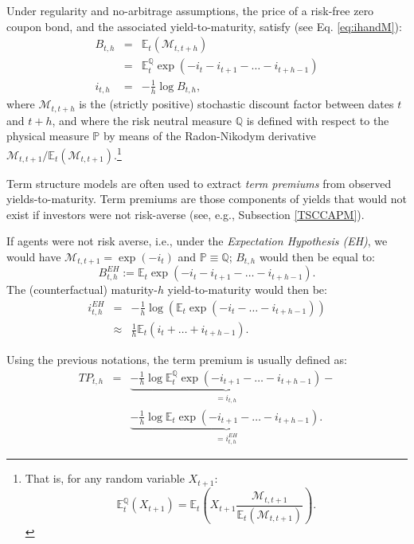 \documentclass[
  12pt,
]{book}
\theoremstyle{definition}
\theoremstyle{definition}
\theoremstyle{definition}
\theoremstyle{definition}
\theoremstyle{remark}
\begin{document}
Under regularity and no-arbitrage assumptions, the price of a risk-free zero coupon bond, and the associated yield-to-maturity, satisfy (see Eq. \eqref{eq:ihandM}):
\begin{eqnarray}
B_{t,h} &=& \mathbb{E}_t (\mathcal{M}_{t,t+h})\nonumber\\
&=& \mathbb{E}^{\mathbb{Q}}_t \exp(-i_t -i_{t+1}-\dots-i_{t+h-1})\nonumber\\
i_{t,h} &=& - \frac{1}{h} \log B_{t,h}, \label{eq:stdbondRFchapter}
\end{eqnarray}
where \(\mathcal{M}_{t,t+h}\) is the (strictly positive) stochastic discount factor between dates \(t\) and \(t+h\), and where the risk neutral measure \(\mathbb{Q}\) is defined with respect to the physical measure \(\mathbb{P}\) by means of the Radon-Nikodym derivative \(\mathcal{M}_{t,t+1}\big/\mathbb{E}_t(\mathcal{M}_{t,t+1})\).\footnote{That is, for any random variable \(X_{t+1}\):
  \[
  \mathbb{E}^{\mathbb{Q}}_t(X_{t+1})=\mathbb{E}_t\left(X_{t+1}\frac{\mathcal{M}_{t,t+1}}{\mathbb{E}_t(\mathcal{M}_{t,t+1})}\right).
  \]}

Term structure models are often used to extract \emph{term premiums} from observed yields-to-maturity. Term premiums are those components of yields that would not exist if investors were not risk-averse (see, e.g., Subsection \ref{TSCCAPM}).

If agents were not risk averse, i.e., under the \emph{Expectation Hypothesis (EH)}, we would have \(\mathcal{M}_{t,t+1} = \exp(- i_t)\) and \(\mathbb{P} \equiv \mathbb{Q}\); \(B_{t,h}\) would then be equal to:
\begin{equation}
B^{EH}_{t,h} := \mathbb{E}_t \exp(-i_{t}-i_{t+1}-\dots-i_{t+h-1}).\label{eq:stdbondRFchapterP}
\end{equation}
The (counterfactual) maturity-\(h\) yield-to-maturity would then be:
\begin{eqnarray}
i^{EH}_{t,h} &=& -\frac{1}{h}\log \left( \mathbb{E}_t \exp(-i_t-\dots-i_{t+h-1})\right)\nonumber\\
&\approx& \frac{1}{h}\mathbb{E}_t(i_t + \dots + i_{t+h-1}).\label{eq:REH}
\end{eqnarray}

Using the previous notations, the term premium is usually defined as:
\begin{eqnarray}
TP_{t,h} &=& \underbrace{- \frac{1}{h} \log  \mathbb{E}^{\mathbb{Q}}_t \exp(-i_{t+1}-\dots-i_{t+h-1})}_{=i_{t,h}} - \nonumber \\
&& \underbrace{- \frac{1}{h}  \log  \mathbb{E}_t \exp(-i_{t+1}-\dots-i_{t+h-1}).}_{=i^{EH}_{t,h}}\label{eq:TP}
\end{eqnarray}
\end{document}
